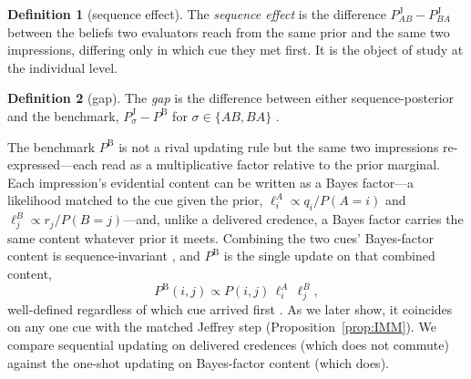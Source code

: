 \documentclass[a4paper,fleqn]{cas-sc}
\theoremstyle{remark}
\theoremstyle{definition}
\newtheorem{definition}{Definition}
\newcommand{\PB}{P^{\mathrm{B}}}
\newcommand{\PJ}{P^{\mathrm{J}}}
\newcommand{\anchor}[1]{}
\begin{document}
\begin{definition}[sequence effect]\label{def:seqeffect}
The \emph{sequence effect} is the difference $\PJ_{AB}-\PJ_{BA}$ between the beliefs two
evaluators reach from the same prior and the same two impressions, differing only in which cue
they met first. It is the object of study at the individual level.
\end{definition}

\begin{definition}[gap]\label{def:indgap}
The \emph{gap} is the difference between either sequence-posterior and the benchmark,
$\PJ_\sigma-\PB$ for $\sigma\in\{AB,BA\}$ \anchor{Setup}.
\end{definition}

The benchmark $\PB$ is not a rival updating rule but the same two impressions
re-expressed---each read as a multiplicative factor relative to the prior marginal. Each impression's evidential content can be written as a Bayes factor---a likelihood
matched to the cue given the prior, $\ell^{A}_{i}\propto q_{i}/P(A{=}i)$ and
$\ell^{B}_{j}\propto r_{j}/P(B{=}j)$---and, unlike a delivered credence, a Bayes factor carries
the same content whatever prior it meets. Combining the two cues' Bayes-factor content is
sequence-invariant \citep{Wagner2002}, and $\PB$ is the single update on that combined content,
\[
  \PB(i,j)\propto P(i,j)\,\ell^{A}_{i}\,\ell^{B}_{j},
\]
well-defined regardless of which cue arrived first \anchor{Setup}. As we later show, it coincides
on any one cue with the matched Jeffrey step (Proposition~\ref{prop:IMM}). We compare sequential updating on delivered credences (which does not commute) against the one-shot updating on Bayes-factor content (which does). 
\end{document}

